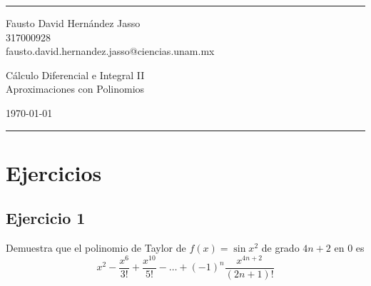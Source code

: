 \documentclass[a4paper]{article}
\begin{document}

\fancyhead[C]{}
\hrule \medskip %
\begin{minipage}{0.35\textwidth} 
\raggedright
\footnotesize
Fausto David Hernández Jasso \hfill\\   
317000928 \hfill\\
fausto.david.hernandez.jasso@ciencias.unam.mx
\end{minipage}
\begin{minipage}{0.4\textwidth} 
\centering 
\large 
Cálculo Diferencial e Integral II\\ 
\normalsize 
Aproximaciones con Polinomios\\ 
\end{minipage}
\begin{minipage}{0.24\textwidth} 
\raggedleft
\today\hfill\\
\end{minipage}
\medskip\hrule 
\bigskip
\section{Ejercicios}
\subsection{Ejercicio 1}
\noindent
Demuestra que el polinomio de Taylor de \(f(x) = \sin{x^2}\) de grado \(4n + 2\) en \(0\)
es
\[
    x^2 - \frac{x^6}{3!} + \frac{x^{10}}{5!} - \dotsc + (-1)^n \frac{x^{4n + 2}}{(2n + 1)!}
\]
\end{document}
